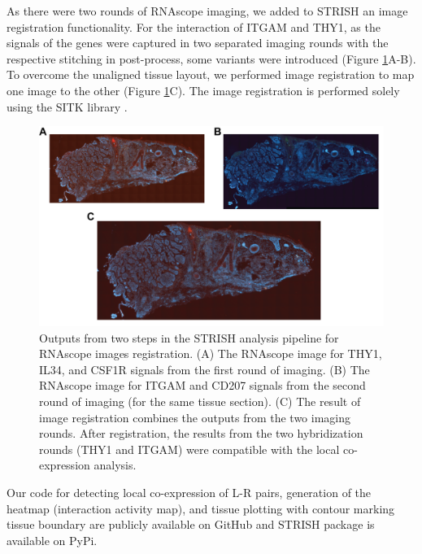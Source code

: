 As there were two rounds of RNAscope imaging, we added to STRISH an image registration functionality. For the interaction of ITGAM and THY1, as the signals of the genes were captured in two separated imaging rounds with the respective stitching in post-process, some variants were introduced (Figure \ref{fig:Chap2_Supfigure7}A-B). To overcome the unaligned tissue layout, we performed image registration to map one image to the other (Figure \ref{fig:Chap2_Supfigure7}C). The image registration is performed solely using the SITK library \cite{lowekamp2013design, yaniv2018simpleitk}.  

\begin{figure}[ht]
\renewcommand{\figurename}{Figure}
    \centering
    \includegraphics[width=0.75\columnwidth]{Chapter2/Figures/Supplemental_Fig_S7.png}
    \caption[Outputs from two steps in the STRISH analysis pipeline for RNAscope images registration.]{Outputs from two steps in the STRISH analysis pipeline for RNAscope images registration. (A) The RNAscope image for THY1, IL34, and CSF1R signals from the first round of imaging. (B) The RNAscope image for ITGAM and CD207 signals from the second round of imaging (for the same tissue section). (C) The result of image registration combines the outputs from the two imaging rounds. After registration, the results from the two hybridization rounds (\ie THY1 and ITGAM) were compatible with the local co-expression analysis.}
    \label{fig:Chap2_Supfigure7}
\end{figure}

Our code for detecting local co-expression of L-R pairs, generation of the heatmap (interaction activity map), and tissue plotting with contour marking tissue boundary are publicly available on GitHub and STRISH package is available on PyPi. 

